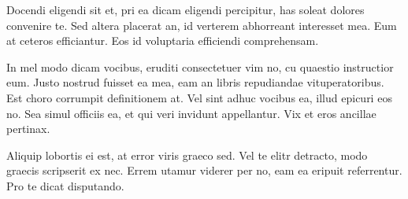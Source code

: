 Docendi eligendi sit et, pri ea dicam eligendi percipitur, has soleat 
dolores convenire te. Sed altera placerat an, id verterem abhorreant 
interesset mea. Eum at ceteros efficiantur. Eos id voluptaria efficiendi 
comprehensam. 

In mel modo dicam vocibus, eruditi consectetuer vim no, cu quaestio 
instructior eum. Justo nostrud fuisset ea mea, eam an libris repudiandae 
vituperatoribus. Est choro corrumpit definitionem at. Vel sint adhuc vocibus 
ea, illud epicuri eos no. Sea simul officiis ea, et qui veri invidunt 
appellantur. Vix et eros ancillae pertinax.

Aliquip lobortis ei est, at error viris graeco sed. Vel te elitr detracto, 
modo graecis scripserit ex nec. Errem utamur viderer per no, eam ea eripuit 
referrentur. Pro te dicat disputando. 

